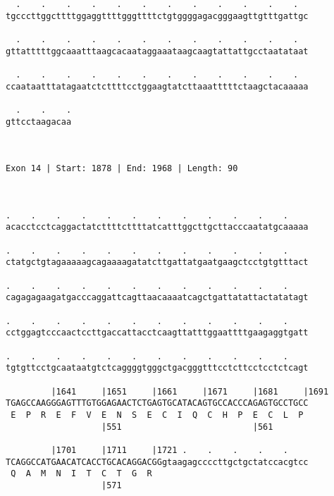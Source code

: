 \documentclass{article}
\begin{document}
\begin{Verbatim}
  .    .    .    .    .    .    .    .    .    .    .    .  
tgcccttggcttttggaggttttgggttttctgtggggagacgggaagttgtttgattgc
                                                            
  .    .    .    .    .    .    .    .    .    .    .    .  
gttatttttggcaaatttaagcacaataggaaataagcaagtattattgcctaatataat
                                                            
  .    .    .    .    .    .    .    .    .    .    .    .  
ccaataatttatagaatctcttttcctggaagtatcttaaatttttctaagctacaaaaa
                                                            
  .    .    .
gttcctaagacaa
             
             
 
Exon 14 | Start: 1878 | End: 1968 | Length: 90



.    .    .    .    .    .    .    .    .    .    .    .    
acacctcctcaggactatcttttcttttatcatttggcttgcttacccaatatgcaaaaa
                                                            
.    .    .    .    .    .    .    .    .    .    .    .    
ctatgctgtagaaaaagcagaaaagatatcttgattatgaatgaagctcctgtgtttact
                                                            
.    .    .    .    .    .    .    .    .    .    .    .    
cagagagaagatgacccaggattcagttaacaaaatcagctgattatattactatatagt
                                                            
.    .    .    .    .    .    .    .    .    .    .    .    
cctggagtcccaactccttgaccattacctcaagttatttggaattttgaagaggtgatt
                                                            
.    .    .    .    .    .    .    .    .    .    .    .    
tgtgttcctgcaataatgtctcaggggtgggctgacgggtttcctcttcctcctctcagt
                                                            
         |1641     |1651     |1661     |1671     |1681     |1691
TGAGCCAAGGGAGTTTGTGGAGAACTCTGAGTGCATACAGTGCCACCCAGAGTGCCTGCC
 E  P  R  E  F  V  E  N  S  E  C  I  Q  C  H  P  E  C  L  P 
                   |551                          |561       
  
         |1701     |1711     |1721 .    .    .    .    .    
TCAGGCCATGAACATCACCTGCACAGGACGGgtaagagccccttgctgctatccacgtcc
 Q  A  M  N  I  T  C  T  G  R                               
                   |571                                     
  

\end{Verbatim}
\end{document}
